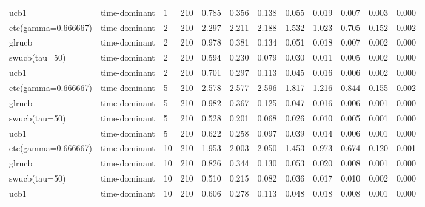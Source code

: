 \begin{tabular}{llllllllllll}
ucb1 & time-dominant & 1 & 210 & 0.785 & 0.356 & 0.138 & 0.055 & 0.019 & 0.007 & 0.003 & 0.000 \\
etc(gamma=0.666667) & time-dominant & 2 & 210 & 2.297 & 2.211 & 2.188 & 1.532 & 1.023 & 0.705 & 0.152 & 0.002 \\
glrucb & time-dominant & 2 & 210 & 0.978 & 0.381 & 0.134 & 0.051 & 0.018 & 0.007 & 0.002 & 0.000 \\
swucb(tau=50) & time-dominant & 2 & 210 & 0.594 & 0.230 & 0.079 & 0.030 & 0.011 & 0.005 & 0.002 & 0.000 \\
ucb1 & time-dominant & 2 & 210 & 0.701 & 0.297 & 0.113 & 0.045 & 0.016 & 0.006 & 0.002 & 0.000 \\
etc(gamma=0.666667) & time-dominant & 5 & 210 & 2.578 & 2.577 & 2.596 & 1.817 & 1.216 & 0.844 & 0.155 & 0.002 \\
glrucb & time-dominant & 5 & 210 & 0.982 & 0.367 & 0.125 & 0.047 & 0.016 & 0.006 & 0.001 & 0.000 \\
swucb(tau=50) & time-dominant & 5 & 210 & 0.528 & 0.201 & 0.068 & 0.026 & 0.010 & 0.005 & 0.001 & 0.000 \\
ucb1 & time-dominant & 5 & 210 & 0.622 & 0.258 & 0.097 & 0.039 & 0.014 & 0.006 & 0.001 & 0.000 \\
etc(gamma=0.666667) & time-dominant & 10 & 210 & 1.953 & 2.003 & 2.050 & 1.453 & 0.973 & 0.674 & 0.120 & 0.001 \\
glrucb & time-dominant & 10 & 210 & 0.826 & 0.344 & 0.130 & 0.053 & 0.020 & 0.008 & 0.001 & 0.000 \\
swucb(tau=50) & time-dominant & 10 & 210 & 0.510 & 0.215 & 0.082 & 0.036 & 0.017 & 0.010 & 0.002 & 0.000 \\
ucb1 & time-dominant & 10 & 210 & 0.606 & 0.278 & 0.113 & 0.048 & 0.018 & 0.008 & 0.001 & 0.000 \\
\bottomrule
\end{tabular}
